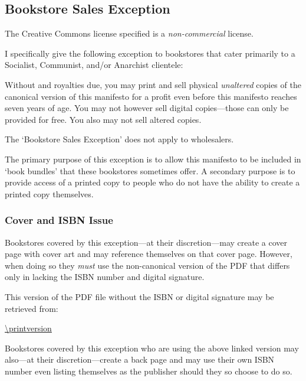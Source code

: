 

\subsection{Bookstore Sales Exception}

The Creative Commons license specified is a \emph{non-commercial} license.

I specifically give the following exception to bookstores that cater primarily to a Socialist, Communist, and/or Anarchist clientele:

Without and royalties due, you may print and sell physical \emph{unaltered} copies of the canonical version of this manifesto for a profit even before this manifesto reaches seven years of age. You may not however sell digital copies---those can only be provided for free. You also may not sell altered copies.

The `Bookstore Sales Exception' does not apply to wholesalers.

The primary purpose of this exception is to allow this manifesto to be included in `book bundles' that these bookstores sometimes offer. A secondary purpose is to provide access of a printed copy to people who do not have the ability to create a printed copy themselves.

\subsubsection{Cover and ISBN Issue}

Bookstores covered by this exception---at their discretion---may create a cover page with cover art and may reference themselves on that cover page. However, when doing so they \emph{must} use the non-canonical version of the PDF that differs only in lacking the ISBN number and digital signature.

This version of the PDF file without the ISBN or digital signature may be retrieved from:

\bigskip

\url{\printversion}

\bigskip

Bookstores covered by this exception who are using the above linked version may also---at their discretion---create a back page and may use their own ISBN number even listing themselves as the publisher should they so choose to do so.


